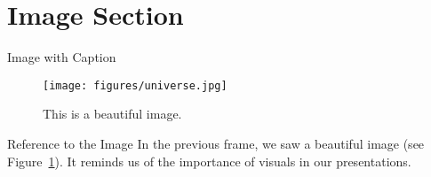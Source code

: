 \section{Image Section}
\label{image_section}


\begin{frame}{Image with Caption}
  \begin{figure}
    \texttt{[image: figures/universe.jpg]} %
    \caption{This is a beautiful image.}
    \label{fig:sampleimage}
  \end{figure}
\end{frame}

\begin{frame}{Reference to the Image}
  In the previous frame, we saw a beautiful image (see Figure~\ref{fig:sampleimage}). It reminds us of the importance of visuals in our presentations.
\end{frame}